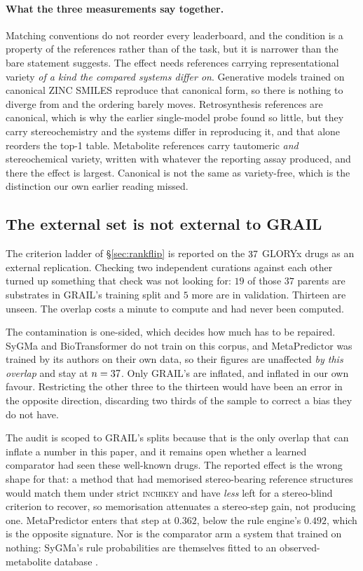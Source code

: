 \paragraph{What the three measurements say together.} Matching conventions do not reorder every
leaderboard, and the condition is a property of the references rather than of the task, but it is
narrower than the bare statement suggests. The effect needs references carrying representational variety
\emph{of a kind the compared systems differ on}. Generative models trained on canonical ZINC SMILES
reproduce that canonical form, so there is nothing to diverge from and the ordering barely moves.
Retrosynthesis references are canonical, which is why the earlier single-model probe found so
little, but they carry stereochemistry and the systems differ in reproducing it, and that alone
reorders the top-1 table. Metabolite references carry tautomeric \emph{and} stereochemical variety,
written with whatever the reporting assay produced, and there the effect is largest. Canonical is
not the same as variety-free, which is the distinction our own earlier reading missed.

\subsection{The external set is not external to GRAIL}

The criterion ladder of \S\ref{sec:rankflip} is reported on the $37$ GLORYx drugs as an
external replication. Checking two independent curations against each other turned up something
that check was not looking for: $19$ of those $37$ parents are substrates in GRAIL's training split
and $5$ more are in validation. Thirteen are unseen. The overlap costs a minute to compute and had
never been computed.

The contamination is one-sided, which decides how much has to be repaired. SyGMa and BioTransformer
do not train on this corpus, and MetaPredictor was trained by its authors on their own data, so
their figures are unaffected \emph{by this overlap} and stay at $n=37$. Only GRAIL's are
inflated, and inflated in our
own favour. Restricting the other three to the thirteen would have been an error in the opposite
direction, discarding two thirds of the sample to correct a bias they do not have.

The audit is scoped to GRAIL's splits because that is the only overlap that can inflate a number in
this paper, and it remains open whether a learned comparator had seen these well-known drugs.
The reported effect is the wrong shape for that: a method that had memorised stereo-bearing
reference structures would match them under strict \textsc{inchikey} and have \emph{less} left for a
stereo-blind criterion to recover, so memorisation attenuates a stereo-step gain, not producing one. MetaPredictor enters that step at $0.362$, below the rule engine's $0.492$, which is
the opposite signature. Nor is the comparator arm a system that trained on nothing: SyGMa's rule
probabilities are themselves fitted to an observed-metabolite database \citep{Ridder_2008}.

